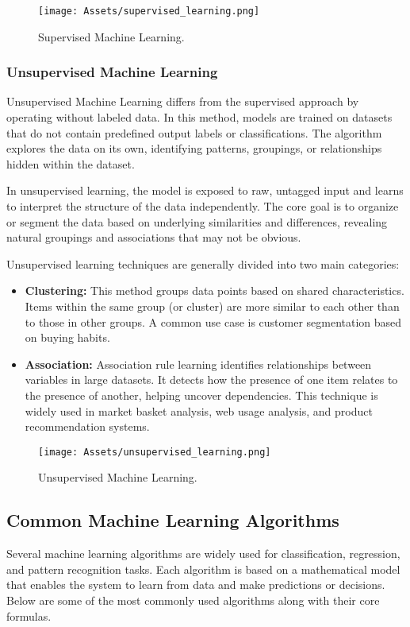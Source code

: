 \begin{figure}[H]
    \centering
    \texttt{[image: Assets/supervised\_learning.png]}
    \caption{Supervised Machine Learning.}
    \label{fig:supervised_learning}
\end{figure}

\subsubsection*{Unsupervised Machine Learning}
Unsupervised Machine Learning differs from the supervised approach by operating without labeled data. In this method, models are trained on datasets that do not contain predefined output labels or classifications. The algorithm explores the data on its own, identifying patterns, groupings, or relationships hidden within the dataset.

In unsupervised learning, the model is exposed to raw, untagged input and learns to interpret the structure of the data independently. The core goal is to organize or segment the data based on underlying similarities and differences, revealing natural groupings and associations that may not be obvious.

Unsupervised learning techniques are generally divided into two main categories:

\begin{itemize}
  \item \textbf{Clustering:} This method groups data points based on shared characteristics. Items within the same group (or cluster) are more similar to each other than to those in other groups. A common use case is customer segmentation based on buying habits.

  \item \textbf{Association:} Association rule learning identifies relationships between variables in large datasets. It detects how the presence of one item relates to the presence of another, helping uncover dependencies. This technique is widely used in market basket analysis, web usage analysis, and product recommendation systems.
  
\end{itemize}
\begin{figure}[H]
    \centering
    \texttt{[image: Assets/unsupervised\_learning.png]}
    \caption{Unsupervised Machine Learning.}
    \label{fig:unsupervised_learning}
\end{figure}

\subsection{Common Machine Learning Algorithms}
Several machine learning algorithms are widely used for classification, regression, and pattern recognition tasks. Each algorithm is based on a mathematical model that enables the system to learn from data and make predictions or decisions. Below are some of the most commonly used algorithms along with their core formulas.
